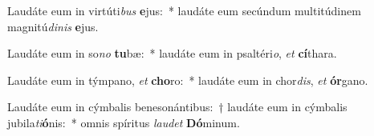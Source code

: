 \item Laudáte eum in virtúti\textit{bus} \textbf{e}jus:~* laudáte eum secúndum multitúdinem magnitú\textit{di}\textit{nis} \textbf{e}jus.
\item Laudáte eum in so\textit{no} \textbf{tu}bæ:~* laudáte eum in psaltéri\textit{o}, \textit{et} \textbf{cí}thara.
\item Laudáte eum in týmpano, \textit{et} \textbf{cho}ro:~* laudáte eum in chor\textit{dis}, \textit{et} \textbf{ór}gano.
\item Laudáte eum in cýmbalis benesonántibus:~† laudáte eum in cýmbalis jubila\textit{ti}\textbf{ó}nis:~* omnis spíritus \textit{lau}\textit{det} \textbf{Dó}minum.
